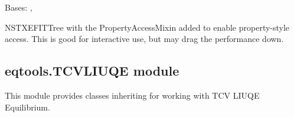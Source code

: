 \documentclass[letterpaper,10pt,english]{sphinxmanual}
\begin{document}

\begin{fulllineitems}
\label{\detokenize{eqtools:eqtools.NSTXEFIT.NSTXEFITTreeProp}}
Bases: {\hyperref[\detokenize{eqtools:eqtools.NSTXEFIT.NSTXEFITTree}]{}}, {\hyperref[\detokenize{eqtools:eqtools.core.PropertyAccessMixin}]{}}

NSTXEFITTree with the PropertyAccessMixin added to enable property-style
access. This is good for interactive use, but may drag the performance down.

\end{fulllineitems}



\subsection{eqtools.TCVLIUQE module}
\label{\detokenize{eqtools:module-eqtools.TCVLIUQE}}\label{\detokenize{eqtools:eqtools-tcvliuqe-module}}
This module provides classes inheriting {\hyperref[\detokenize{eqtools:eqtools.EFIT.EFITTree}]{}} for
working with TCV LIUQE Equilibrium.

\begin{fulllineitems}
\label{\detokenize{eqtools:eqtools.TCVLIUQE.greenArea}}
\end{fulllineitems}

\end{document}

